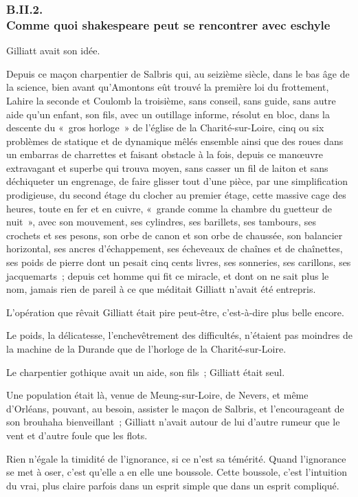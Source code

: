 \documentclass[french,twoside]{book} %
\begin{document}
 \subsubsection[{B.II.2. Comme quoi shakespeare peut se rencontrer avec eschyle}]{B.II.2. \\
Comme quoi shakespeare peut se rencontrer avec eschyle}
\noindent Gilliatt avait son idée.\par
Depuis ce maçon charpentier de Salbris qui, au seizième siècle, dans le bas âge de la science, bien avant qu’Amontons eût trouvé la première loi du frottement, Lahire la seconde et Coulomb la troisième, sans conseil, sans guide, sans autre aide qu’un enfant, son fils, avec un outillage informe, résolut en bloc, dans la descente du « gros horloge » de l’église de la Charité-sur-Loire, cinq ou six problèmes de statique et de dynamique mêlés ensemble ainsi que des roues dans un embarras de charrettes et faisant obstacle à la fois, depuis ce manœuvre extravagant et superbe qui trouva moyen, sans casser un fil de laiton et sans déchiqueter un engrenage, de faire glisser tout d’une pièce, par une simplification prodigieuse, du second étage du clocher au premier étage, cette massive cage des heures, toute en fer et en cuivre, « grande comme  la chambre du guetteur de nuit », avec son mouvement, ses cylindres, ses barillets, ses tambours, ses crochets et ses pesons, son orbe de canon et son orbe de chaussée, son balancier horizontal, ses ancres d’échappement, ses écheveaux de chaînes et de chaînettes, ses poids de pierre dont un pesait cinq cents livres, ses sonneries, ses carillons, ses jacquemarts ; depuis cet homme qui fit ce miracle, et dont on ne sait plus le nom, jamais rien de pareil à ce que méditait Gilliatt n’avait été entrepris.\par
L’opération que rêvait Gilliatt était pire peut-être, c’est-à-dire plus belle encore.\par
Le poids, la délicatesse, l’enchevêtrement des difficultés, n’étaient pas moindres de la machine de la Durande que de l’horloge de la Charité-sur-Loire.\par
Le charpentier gothique avait un aide, son fils ; Gilliatt était seul.\par
Une population était là, venue de Meung-sur-Loire, de Nevers, et même d’Orléans, pouvant, au besoin, assister le maçon de Salbris, et l’encourageant de son brouhaha bienveillant ; Gilliatt n’avait autour de lui d’autre rumeur que le vent et d’autre foule que les flots.\par
Rien n’égale la timidité de l’ignorance, si ce n’est sa témérité. Quand l’ignorance se met à oser, c’est qu’elle a en elle une boussole. Cette boussole, c’est l’intuition du vrai, plus claire parfois dans un esprit simple que dans un esprit compliqué.\par
\end{document}

